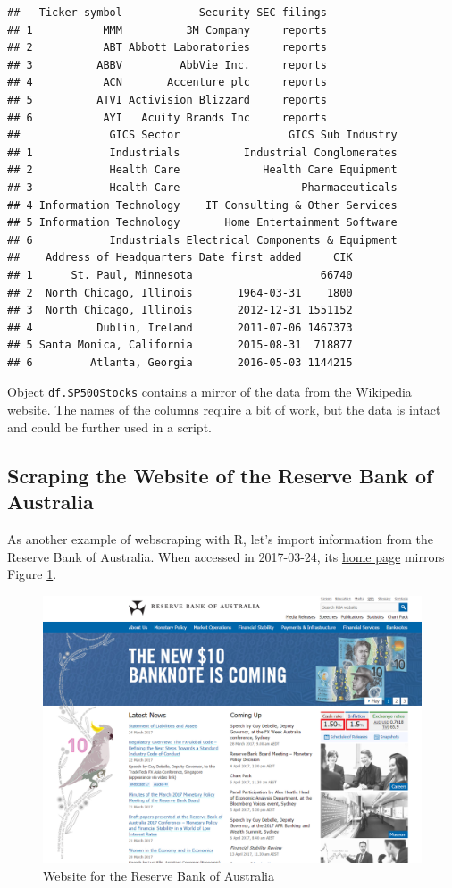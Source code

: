\documentclass[11pt,]{book}
\begin{document}
\begin{verbatim}
##   Ticker symbol            Security SEC filings
## 1           MMM          3M Company     reports
## 2           ABT Abbott Laboratories     reports
## 3          ABBV         AbbVie Inc.     reports
## 4           ACN       Accenture plc     reports
## 5          ATVI Activision Blizzard     reports
## 6           AYI   Acuity Brands Inc     reports
##              GICS Sector                 GICS Sub Industry
## 1            Industrials          Industrial Conglomerates
## 2            Health Care             Health Care Equipment
## 3            Health Care                   Pharmaceuticals
## 4 Information Technology    IT Consulting & Other Services
## 5 Information Technology       Home Entertainment Software
## 6            Industrials Electrical Components & Equipment
##    Address of Headquarters Date first added     CIK
## 1      St. Paul, Minnesota                    66740
## 2  North Chicago, Illinois       1964-03-31    1800
## 3  North Chicago, Illinois       2012-12-31 1551152
## 4          Dublin, Ireland       2011-07-06 1467373
## 5 Santa Monica, California       2015-08-31  718877
## 6         Atlanta, Georgia       2016-05-03 1144215
\end{verbatim}

Object \texttt{df.SP500Stocks} contains a mirror of the data from the
Wikipedia website. The names of the columns require a bit of work, but
the data is intact and could be further used in a script.

\subsection{Scraping the Website of the Reserve Bank of
Australia}\label{scraping-the-website-of-the-reserve-bank-of-australia}

As another example of webscraping with R, let's import information from
the Reserve Bank of Australia. When accessed in 2017-03-24, its
\href{http://www.rba.gov.au/}{home page} mirrors Figure
\ref{fig:RBA-website}.

\begin{figure}[!htbp]

{\centering \includegraphics[width=0.75\linewidth]{figs/website_RBA-webscrapping} 

}

\caption{Website for the Reserve Bank of Australia}\label{fig:RBA-website}
\end{figure}
\end{document}
